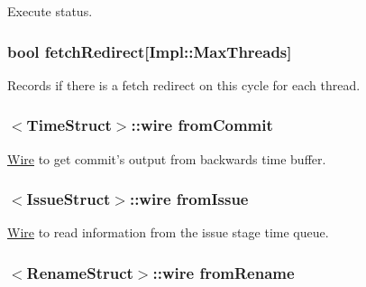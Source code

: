 \label{classDefaultIEW_ab8c04349b85b4d9bf03a601deee720b4}
Execute status. \hypertarget{classDefaultIEW_aa40219506ff80e4e8c5a9a3b1205b282}{
\subsubsection[{fetchRedirect}]{\setlength{\rightskip}{0pt plus 5cm}bool {\bf fetchRedirect}\mbox{[}Impl::MaxThreads\mbox{]}}}
\label{classDefaultIEW_aa40219506ff80e4e8c5a9a3b1205b282}
Records if there is a fetch redirect on this cycle for each thread. \hypertarget{classDefaultIEW_a0055a92bd94eda21c2641d46ff013dac}{
\subsubsection[{fromCommit}]{$<${\bf TimeStruct}$>$::wire {\bf fromCommit}}}
\label{classDefaultIEW_a0055a92bd94eda21c2641d46ff013dac}
\hyperlink{classWire}{Wire} to get commit's output from backwards time buffer. \hypertarget{classDefaultIEW_af6f43373b6586aa8c486538fb076effb}{
\subsubsection[{fromIssue}]{$<${\bf IssueStruct}$>$::wire {\bf fromIssue}}}
\label{classDefaultIEW_af6f43373b6586aa8c486538fb076effb}
\hyperlink{classWire}{Wire} to read information from the issue stage time queue. \hypertarget{classDefaultIEW_a2b6b1d4785b92bd378f8a7abc5b7e6b9}{
\subsubsection[{fromRename}]{$<${\bf RenameStruct}$>$::wire {\bf fromRename}}}
